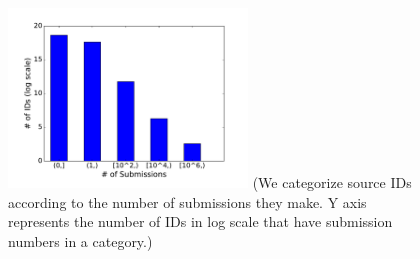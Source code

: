 \begin{figure}[t!]
\begin{center}
\includegraphics[width=2.5in]{figure/IDDistribution}
{\footnotesize{(We categorize source IDs according to the number of submissions they make.
Y axis represents the number of IDs in log scale that have submission numbers in a category.)}}
\end{center}
\end{figure}
